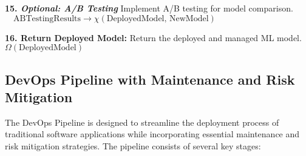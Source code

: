 \documentclass[12pt, letterpaper]{article}
\begin{document}
\begin{algorithm}[h!]
\begin{algorithmic}[1]
        \State \textbf{15. \textit{Optional: A/B Testing}}
        \State \quad Implement A/B testing for model comparison. \\
        $ \quad \text{ABTestingResults} \xrightarrow{} \chi(\text{DeployedModel, NewModel})$ 

        \State \textbf{16. Return Deployed Model:}
        \State \quad Return the deployed and managed ML model. \\
        \Return $\Omega(\text{DeployedModel})$ 
        \EndProcedure
    \end{algorithmic}
\end{algorithm}






\subsection*{DevOps Pipeline with Maintenance and Risk Mitigation}

The DevOps Pipeline is designed to streamline the deployment process of traditional software applications while incorporating essential maintenance and risk mitigation strategies. The pipeline consists of several key stages:
\end{document}
